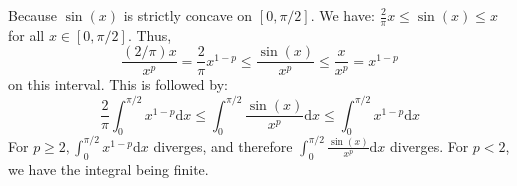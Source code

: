 \begin{numedquestion}
\begin{itemize}
        Because $\sin (x)$ is strictly concave on $[0, \pi / 2] .$ We have: $\frac{2}{\pi} x \leq \sin (x) \leq x$ for all $x \in[0, \pi / 2].$ Thus,
        \[
        \frac{(2 / \pi) x}{x^{p}}=\frac{2}{\pi} x^{1-p} \leq \frac{\sin (x)}{x^{p}} \leq \frac{x}{x^{p}}=x^{1-p}
        \]
        on this interval. This is followed by:
        \[
        \frac{2}{\pi} \int_{0}^{\pi / 2} x^{1-p} \mathrm{d} x \leq \int_{0}^{\pi / 2} \frac{\sin (x)}{x^{p}} \mathrm{d} x \leq \int_{0}^{\pi / 2} x^{1-p} \mathrm{d} x
        \]
        For $p \geq 2, \int_{0}^{\pi / 2} x^{1-p} \mathrm{d} x$ diverges, and therefore $\int_{0}^{\pi / 2} \frac{\sin (x)}{x^{p}} \mathrm{d} x$ diverges. For $p<2$, we have the integral being finite. 
    \end{itemize}
    

    
\end{numedquestion}

